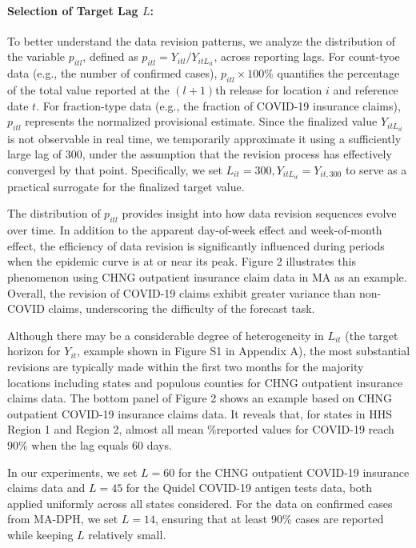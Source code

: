\paragraph{Selection of Target Lag $L$:}
To better understand the data revision patterns, we analyze the distribution of the variable \( p_{itl} \), defined as \( p_{itl} = Y_{itl} / Y_{itL_{it}} \), across reporting lags. For count-tyoe data (e.g., the number of confirmed cases), \( p_{itl} \times 100 \% \) quantifies the percentage of the total value reported at the \((l+1)\)th release for location \( i \) and reference date \( t \). For fraction-type data (e.g., the fraction of COVID-19 insurance claims), \( p_{itl} \) represents the normalized provisional estimate. Since the finalized value \( Y_{itL_{it}} \) is not observable in real time, we temporarily approximate it using a sufficiently large lag of 300, under the assumption that the revision process has effectively converged by that point. Specifically, we set $L_{it} = 300, Y_{itL_{it}} = Y_{it,300}$ to serve as a practical surrogate for the finalized target value.


The distribution of $p_{itl}$ provides insight into how data revision sequences evolve over time. In addition to the apparent day-of-week effect and week-of-month effect, the efficiency of data revision is significantly influenced during periods when the epidemic curve is at or near its peak. Figure 2 illustrates this phenomenon using CHNG outpatient insurance claim data in MA as an example. Overall, the revision of COVID-19 claims exhibit greater variance than non-COVID claims, underscoring the difficulty of the forecast task.

Although there may be a considerable degree of heterogeneity in $L_{it}$ (the target horizon for $Y_{it}$, example shown in Figure S1 in Appendix A), the most substantial revisions are typically made within the first two months for the majority locations including states and populous counties for CHNG outpatient insurance claims data. The bottom panel of Figure 2 shows an example based on CHNG outpatient COVID-19 insurance claims data. It reveals that, for states in HHS Region 1 and Region 2, almost all mean \%reported values for COVID-19 reach 90\% when the lag equals 60 days.  

In our experiments, we set \( L = 60 \) for the CHNG outpatient COVID-19 insurance claims data and \( L = 45 \) for the Quidel COVID-19 antigen tests data, both applied uniformly across all states considered. For the data on confirmed cases from MA-DPH, we set \( L = 14 \), ensuring that at least 90\% cases are reported while keeping \( L \) relatively small.


